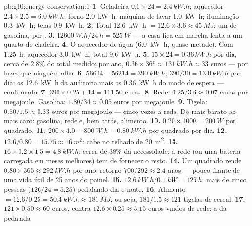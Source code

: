 \begin{solution}{pb:g10:energy-conservation:1}
\textbf{1.} Geladeira $0.1 \times 24 = \qty{2.4}{kW.h}$; aquecedor
$2.4 \times 2.5 = \qty{6.0}{kW.h}$; forno \qty{2.0}{kW.h}; máquina de
lavar \qty{1.0}{kW.h}; iluminação \qty{0.3}{kW.h}; telas
\qty{0.9}{kW.h}.
\textbf{2.} Total \qty{12.6}{kW.h} $= 12.6 \times 3.6 \approx
\qty{45}{MJ}$: um  de gasolina,  por .
\textbf{3.} $\qty{12600}{W.h}/\qty{24}{h} = \qty{525}{W}$ --- a casa fica
em marcha lenta a um quarto de chaleira.
\textbf{4.} O aquecedor de água (\qty{6.0}{kW.h}, quase metade). Com
\qty{1.25}{h}: aquecedor \qty{3.0}{kW.h}, total \qty{9.6}{kW.h}.
\textbf{5.} $15 \times 24 = \qty{0.36}{kW.h}$ por dia, cerca de $2.8\%$
do total medido; por ano,
$0.36 \times 365 \approx \qty{131}{kW.h} \approx 33$ euros --- por luzes
que ninguém olha.
\textbf{6.} $56604 - 56214 = \qty{390}{kW.h}$;
$390/30 = \qty{13.0}{kW.h}$ por dia: os \qty{12.6}{kW.h} da auditoria
mais os \qty{0.36}{kW.h} do modo de espera --- confirmado.
\textbf{7.} $390 \times 0.25 + 14 = 111.50$ euros.
\textbf{8.} Rede: $0.25/3.6 \approx 0.07$ euros por megajoule. Gasolina:
$1.80/34 \approx 0.05$ euros por megajoule.
\textbf{9.} Tigela: $0.50/1.5 \approx 0.33$ euros por megajoule ---
cinco vezes a rede. Do mais barato ao mais caro: gasolina, rede e, bem
atrás, alimento.
\textbf{10.} $0.20 \times 1000 = \qty{200}{W}$ por  quadrado.
\textbf{11.} $200 \times 4.0 = \qty{800}{W.h} = \qty{0.80}{kW.h}$ por
 quadrado por dia.
\textbf{12.} $12.6/0.80 = 15.75 \approx \qty{16}{m^2}$: cabe no telhado
de \qty{20}{m^2}.
\textbf{13.} $16 \times 0.2 \times 1.5 = \qty{4.8}{kW.h}$: cerca de
$38\%$ da necessidade; a rede (ou uma bateria carregada em meses
melhores) tem de fornecer o resto.
\textbf{14.} Um  quadrado rende
$0.80 \times 365 \approx \qty{292}{kW.h}$ por ano; retorno
$700/292 \approx 2.4$ anos --- pouco diante de uma vida útil de 25 anos
do painel.
\textbf{15.} $\qty{12.6}{kW.h}/\qty{0.1}{kW} = \qty{126}{h}$: mais de
cinco pessoas ($126/24 = 5.25$) pedalando dia e noite.
\textbf{16.} Alimento $= 12.6/0.25 = \qty{50.4}{kW.h} \approx
\qty{181}{MJ}$, ou seja, $181/1.5 \approx 121$ tigelas de cereal.
\textbf{17.} $121 \times 0.50 \approx 60$ euros, contra
$12.6 \times 0.25 \approx 3.15$ euros vindos da rede: a  da pedalada

\end{solution}
